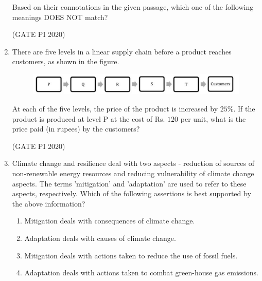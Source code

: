 \documentclass[journal,12pt,onecolumn]{IEEEtran}
\theoremstyle{remark}
\begin{document}
\begin{enumerate}
Based on their connotations in the given passage, which one of the following meanings DOES NOT match?
\begin{enumerate}
\end{enumerate}

\hfill (GATE PI 2020)

\item
There are five levels  in a linear supply chain before a product reaches customers, as shown in the figure.


\begin{figure}[H]
    \centering
    \includegraphics[width=0.5\columnwidth]{figs/fig1.png}
    \caption{}
    \label{fig:placeholder}
\end{figure} 



At each of the five levels, the price of the product is increased by $25\%$. If the product is produced at level P at the cost of Rs. $120$ per unit, what is the price paid (in rupees) by the customers?
\begin{enumerate}
\end{enumerate}

\hfill (GATE PI 2020)

\item Climate change and resilience deal with two aspects - reduction of sources of non-renewable energy resources and reducing vulnerability of climate change aspects. The terms 'mitigation' and 'adaptation' are used to refer to these aspects, respectively.
Which of the following assertions is best supported by the above information?
\begin{enumerate}
    \item Mitigation deals with consequences of climate change.
    \item Adaptation deals with causes of climate change.
    \item Mitigation deals with actions taken to reduce the use of fossil fuels.
    \item Adaptation deals with actions taken to combat green-house gas emissions.
\end{enumerate}


\end{enumerate}
\end{document}
